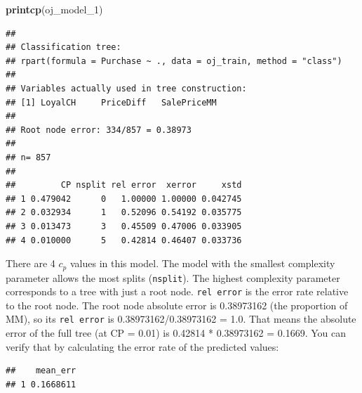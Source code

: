 \documentclass[]{book}
\newenvironment{Shaded}{\begin{snugshade}}{\end{snugshade}}
\newcommand{\DataTypeTok}[1]{\textcolor[rgb]{0.13,0.29,0.53}{#1}}
\newcommand{\DecValTok}[1]{\textcolor[rgb]{0.00,0.00,0.81}{#1}}
\newcommand{\KeywordTok}[1]{\textcolor[rgb]{0.13,0.29,0.53}{\textbf{#1}}}
\newcommand{\NormalTok}[1]{#1}
\newcommand{\OperatorTok}[1]{\textcolor[rgb]{0.81,0.36,0.00}{\textbf{#1}}}
\newcommand{\StringTok}[1]{\textcolor[rgb]{0.31,0.60,0.02}{#1}}
\begin{document}
\begin{Shaded}
\begin{Highlighting}[]
\KeywordTok{printcp}\NormalTok{(oj_model_}\DecValTok{1}\NormalTok{)}
\end{Highlighting}
\end{Shaded}

\begin{verbatim}
## 
## Classification tree:
## rpart(formula = Purchase ~ ., data = oj_train, method = "class")
## 
## Variables actually used in tree construction:
## [1] LoyalCH     PriceDiff   SalePriceMM
## 
## Root node error: 334/857 = 0.38973
## 
## n= 857 
## 
##         CP nsplit rel error  xerror     xstd
## 1 0.479042      0   1.00000 1.00000 0.042745
## 2 0.032934      1   0.52096 0.54192 0.035775
## 3 0.013473      3   0.45509 0.47006 0.033905
## 4 0.010000      5   0.42814 0.46407 0.033736
\end{verbatim}

There are 4 \(c_p\) values in this model. The model with the smallest complexity parameter allows the most splits (\texttt{nsplit}). The highest complexity parameter corresponds to a tree with just a root node. \texttt{rel\ error} is the error rate relative to the root node. The root node absolute error is 0.38973162 (the proportion of MM), so its \texttt{rel\ error} is 0.38973162/0.38973162 = 1.0. That means the absolute error of the full tree (at CP = 0.01) is 0.42814 * 0.38973162 = 0.1669. You can verify that by calculating the error rate of the predicted values:

\begin{Shaded}
\end{Shaded}

\begin{verbatim}
##    mean_err
## 1 0.1668611
\end{verbatim}
\end{document}
